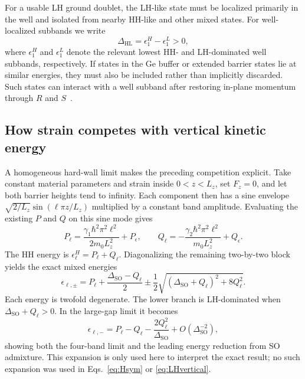 \documentclass[10pt,letterpaper]{article}
\newcommand{\ep}{\epsilon}
\newcommand{\SO}{\mathrm{SO}}
\newcommand{\HLgap}{\Delta_{\mathrm{HL}}}
\begin{document}
For a usable LH ground doublet, the LH-like state must be localized primarily in the well and isolated from nearby HH-like and other mixed states. For well-localized subbands we write
\begin{equation}
\HLgap=\epsilon_1^H-\epsilon_1^L>0,
\label{eq:DHL}
\end{equation}
where $\epsilon_1^H$ and $\epsilon_1^L$ denote the relevant lowest HH- and LH-dominated well subbands, respectively. If states in the Ge buffer or extended barrier states lie at similar energies, they must also be included rather than implicitly discarded. Such states can interact with a well subband after restoring in-plane momentum through $R$ and $S$~\cite{valvo,delvecchio2024}.

\subsection{How strain competes with vertical kinetic energy}

A homogeneous hard-wall limit makes the preceding competition explicit. Take constant material parameters and strain inside $0<z<L_z$, set $F_z=0$, and let both barrier heights tend to infinity. Each component then has a sine envelope $\sqrt{2/L_z}\sin(\ell\pi z/L_z)$ multiplied by a constant band amplitude. Evaluating the existing $P$ and $Q$ on this sine mode gives
\begin{equation}
P_\ell=\frac{\gamma_1\hbar^2\pi^2\ell^2}{2m_0L_z^2}+P_\ep,
\qquad
Q_\ell=-\frac{\gamma_2\hbar^2\pi^2\ell^2}{m_0L_z^2}+Q_\ep.
\label{eq:hardwallPQ}
\end{equation}
The HH energy is $\epsilon_\ell^H=P_\ell+Q_\ell$. Diagonalizing the remaining two-by-two block yields the exact mixed energies
\begin{equation}
\epsilon_{\ell,\pm}
=P_\ell+\frac{\Delta_{\SO}-Q_\ell}{2}
\pm\frac12\sqrt{(\Delta_{\SO}+Q_\ell)^2+8Q_\ell^2}.
\label{eq:hardwalleigen}
\end{equation}
Each energy is twofold degenerate. The lower branch is LH-dominated when $\Delta_{\SO}+Q_\ell>0$. In the large-gap limit it becomes
\begin{equation}
\epsilon_{\ell,-}
=P_\ell-Q_\ell-\frac{2Q_\ell^2}{\Delta_{\SO}}
+O(\Delta_{\SO}^{-2}),
\label{eq:largegap}
\end{equation}
showing both the four-band limit and the leading energy reduction from SO admixture. This expansion is only used here to interpret the exact result; no such expansion was used in Eqs.~\eqref{eq:Hsym} or \eqref{eq:LHvertical}.
\end{document}
